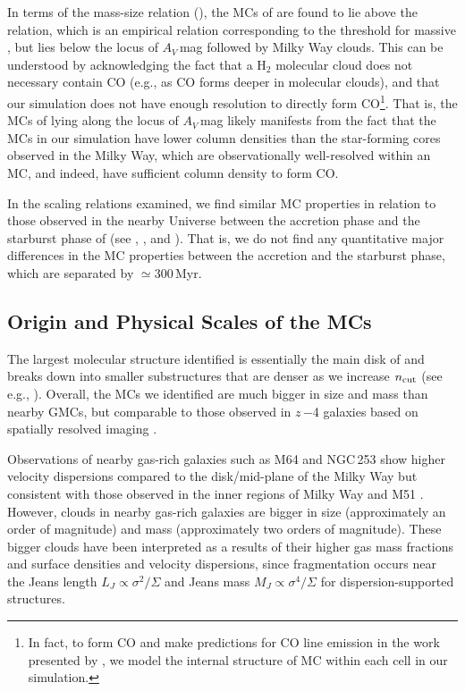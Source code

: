 \IfFileExists{emulateapjlegacy.cls}{\documentclass[iop]{emulateapjlegacy}}{\documentclass[iop]{emulateapj}}
\begin{document}
In terms of the mass-size relation (), the MCs of \flower are found to lie above the \citet{Kauffmann10c} relation, which is an empirical relation corresponding to the threshold for massive \SF, but lies
below the locus of $A_V$\,mag followed by Milky Way clouds. This can be understood by acknowledging the fact that a H$_2$ molecular cloud does not necessary contain CO (e.g., as CO forms deeper in molecular clouds), and that our simulation does not have enough resolution to directly form CO\footnote{In fact, to form CO and make predictions for CO line emission in the work presented by \citet{Vallini18a}, we model the internal structure of MC within each cell in our simulation.}.
%
That is, the MCs of \flower lying along the locus of $A_V$\,mag likely manifests from the fact that the MCs in our simulation have lower column densities than the star-forming cores observed in the Milky Way, which are observationally well-resolved within an MC, and indeed, have sufficient column density to form CO.

In the scaling relations examined, we find similar MC properties in relation to those observed in the nearby Universe between the accretion phase and the starburst phase of \flower (see , , and ). That is, we do not find any quantitative major differences in the MC properties between the accretion and the starburst phase, which are separated by $\simeq$300\,Myr.

\subsection{Origin and Physical Scales of the MCs} \label{sec:origin}

The largest molecular structure identified is essentially the main disk of \flower and breaks down into smaller substructures that are denser as we increase $n_{\rm cut}$ (see e.g., ). Overall, the MCs we identified are much bigger in size and mass than nearby GMCs, but comparable to those observed in $z$\,$-$4 galaxies based on spatially resolved imaging \citep{Swinbank11a}.

Observations of nearby gas-rich galaxies such as M64 and NGC\,253 show higher velocity dispersions compared to the disk/mid-plane of the Milky Way but consistent with those observed in the inner regions of Milky Way and M51 \citep{Oka01a, Rosolowsky05a, Heyer09a, Hughes13b, Leroy15a, Rice16a}.  %
However, clouds in nearby gas-rich galaxies are bigger in size (approximately an order of magnitude) and mass (approximately two orders of magnitude). These bigger clouds have been interpreted as a results of their higher gas mass fractions and surface densities and velocity dispersions, since fragmentation occurs near the Jeans length $L_J\propto\sigma^2/\Sigma$ and Jeans mass $M_J\propto\sigma^4/\Sigma$ for dispersion-supported structures.
\end{document}
